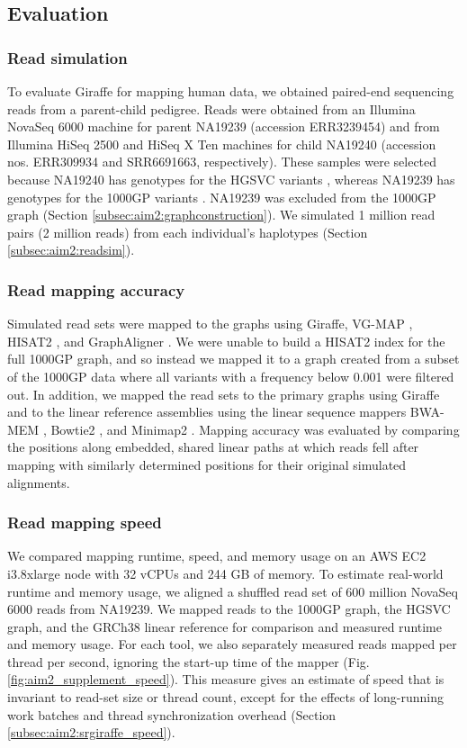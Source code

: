 \documentclass[11pt]{ucscthesis}
\begin{document}
\subsection{Evaluation}
\subsubsection{Read simulation}
To evaluate Giraffe for mapping human data, we obtained paired-end sequencing reads from a parent-child pedigree.
Reads were obtained from an Illumina NovaSeq 6000 machine for parent NA19239 (accession ERR3239454) and from Illumina HiSeq 2500 and HiSeq X Ten machines for child NA19240 (accession nos. ERR309934 and SRR6691663, respectively).
These samples were selected because NA19240 has genotypes for the HGSVC variants \cite{chaisson_sv_2019}, whereas NA19239 has genotypes for the 1000GP variants \cite{1000gp_2015}.
NA19239 was excluded from the 1000GP graph (Section \ref{subsec:aim2:graphconstruction}).
We simulated 1 million read pairs (2 million reads) from each individual’s haplotypes (Section \ref{subsec:aim2:readsim}).

\subsubsection{Read mapping accuracy}
Simulated read sets were mapped to the graphs using Giraffe, VG-MAP \cite{garrison_variation_2018}, HISAT2 \cite{kim_hisat2_2019}, and GraphAligner \cite{rautiainen_graphaligner_2020}.
We were unable to build a HISAT2 index for the full 1000GP graph, and so instead we mapped it to a graph created from a subset of the 1000GP data where all variants with a frequency below 0.001 were filtered out.
In addition, we mapped the read sets to the primary graphs using Giraffe and to the linear reference assemblies using the linear sequence mappers BWA-MEM \cite{li_bwa_mem_2013}, Bowtie2 \cite{langmead_bowtie2_2012}, and Minimap2 \cite{li_minimap2_2018}.
Mapping accuracy was evaluated by comparing the positions along embedded, shared linear paths at which reads fell after mapping with similarly determined positions for their original simulated alignments.

\subsubsection{Read mapping speed}
We compared mapping runtime, speed, and memory usage on an AWS EC2 i3.8xlarge node with 32 vCPUs and 244 GB of memory.
To estimate real-world runtime and memory usage, we aligned a shuffled read set of 600 million NovaSeq 6000 reads from NA19239.
We mapped reads to the 1000GP graph, the HGSVC graph, and the GRCh38 linear reference for comparison and measured runtime and memory usage.
For each tool, we also separately measured reads mapped per thread per second, ignoring the start-up time of the mapper (Fig.\ref*{fig:aim2_supplement_speed}).
This measure gives an estimate of speed that is invariant to read-set size or thread count, except for the effects of long-running work batches and thread synchronization overhead (Section \ref{subsec:aim2:srgiraffe_speed}).
\end{document}
